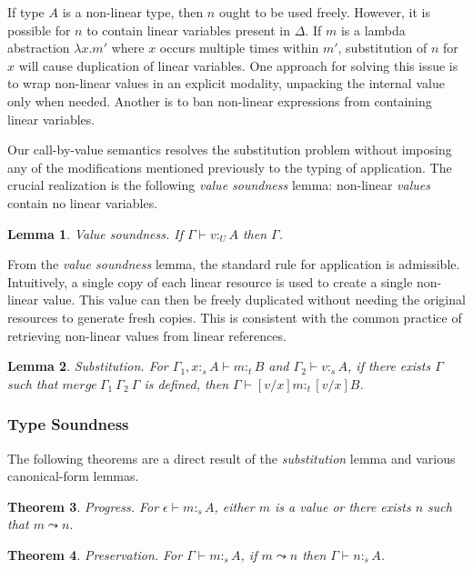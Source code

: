 \documentclass{article}
\newtheorem{theorem}{Theorem}[section]
\newtheorem{lemma}[theorem]{Lemma}
\theoremstyle{definition}
\newcommand{\utype}{:_U}
\newcommand{\stype}[1]{:_#1}
\newcommand{\step}{\leadsto}
\newcommand{\pstep}{\leadsto}
\begin{document}
  If type $A$ is a non-linear type, then $n$ ought to be used freely. However, it is possible for $n$ to contain linear variables present in $\Delta$. If $m$ is a lambda abstraction $\lambda x.m'$ where $x$ occurs multiple times within $m'$, substitution of $n$ for $x$ will cause duplication of linear variables. One approach for solving this issue is to wrap non-linear values in an explicit modality, unpacking the internal value only when needed\cite{substitute,neel15}. Another is to ban non-linear expressions from containing linear variables\cite{llf,luo,qtt}.

  Our call-by-value semantics resolves the substitution problem without imposing any of the modifications mentioned previously to the typing of application. The crucial realization is the following \textit{value soundness} lemma: non-linear \textit{values} contain no linear variables.

  \begin{lemma}
    Value soundness. If $\Gamma \vdash v \utype A$ then $\Gamma$.
  \end{lemma}

  From the \textit{value soundness} lemma, the standard rule for application is admissible. Intuitively, a single copy of each linear resource is used to create a single non-linear value. This value can then be freely duplicated without needing the original resources to generate fresh copies. This is consistent with the common practice of retrieving non-linear values from linear references.

  \begin{lemma}
    Substitution. For $\Gamma_1, x \stype{s} A \vdash m \stype{t} B$ and $\Gamma_2 \vdash v \stype{s} A$, if there exists $\Gamma$ such that $merge\ \Gamma_1\ \Gamma_2\ \Gamma$ is defined, then $\Gamma \vdash [v/x]m \stype{t} [v/x]B$.
  \end{lemma}

  \subsubsection{Type Soundness}
  The following theorems are a direct result of the \textit{substitution} lemma and various canonical-form lemmas. 

  \begin{theorem}
    Progress. For $\epsilon \vdash m \stype{s} A$, either $m$ is a value or there exists $n$ such that $m \step n$.
  \end{theorem}

  \begin{theorem}
    Preservation. For $\Gamma \vdash m \stype{s} A$, if $m \pstep n$ then $\Gamma \vdash n \stype{s} A$.
  \end{theorem}
\end{document}
